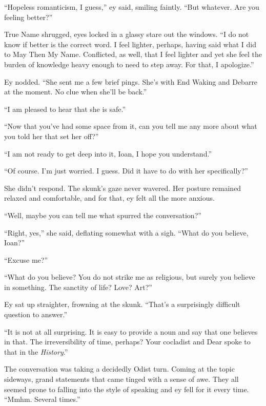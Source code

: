 ``Hopeless romanticism, I guess,'' ey said, smiling faintly. ``But whatever. Are you feeling better?''

True Name shrugged, eyes locked in a glassy stare out the windows. ``I do not know if better is the correct word. I feel lighter, perhaps, having said what I did to May Then My Name. Conflicted, as well, that I feel lighter and yet she feel the burden of knowledge heavy enough to need to step away. For that, I apologize.''

Ey nodded. ``She sent me a few brief pings. She's with End Waking and Debarre at the moment. No clue when she'll be back.''

``I am pleased to hear that she is safe.''

``Now that you've had some space from it, can you tell me any more about what you told her that set her off?''

``I am not ready to get deep into it, Ioan, I hope you understand.''

``Of course. I'm just worried. I guess. Did it have to do with her specifically?''

She didn't respond. The skunk's gaze never wavered. Her posture remained relaxed and comfortable, and for that, ey felt all the more anxious.

``Well, maybe you can tell me what spurred the conversation?''

``Right, yes,'' she said, deflating somewhat with a sigh. ``What do you believe, Ioan?''

``Excuse me?''

``What do you believe? You do not strike me as religious, but surely you believe in something. The sanctity of life? Love? Art?''

Ey sat up straighter, frowning at the skunk. ``That's a surprisingly difficult question to answer.''

``It is not at all surprising. It is easy to provide a noun and say that one believes in that. The irreversibility of time, perhaps? Your cocladist and Dear spoke to that in the \emph{History}.''

The conversation was taking a decidedly Odist turn. Coming at the topic sideways, grand statements that came tinged with a sense of awe. They all seemed prone to falling into the style of speaking and ey fell for it every time. ``Mmhm. Several times.''

